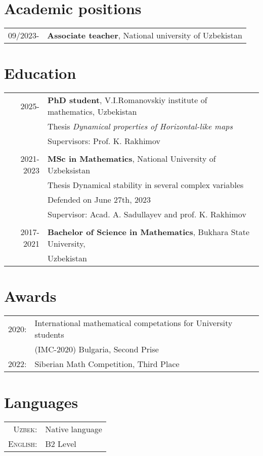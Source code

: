 \documentclass[a4paper,10pt]{article}
\begin{document}
\section{Academic positions}
\begin{tabular}{r|p{11cm}}
 \textsc{09/2023-}  &\textbf{Associate  teacher}, National university of Uzbekistan
\end{tabular}
\section{Education}
\begin{tabular}{r|p{11cm}}	
 \textsc{2025-} & \textbf{PhD student}, V.I.Romanovskiy institute of mathematics, Uzbekistan\\ 
 \textsc{ } & Thesis  \emph{Dynamical properties of Horizontal-like  maps} \\
\textsc{} &  Supervisors: Prof. K. Rakhimov\\ \\
\textsc{2021-2023} &\textbf{MSc in Mathematics}, National University of Uzbeksistan\\
 & 
Thesis Dynamical stability in several complex variables\\ &
Defended on June 27th, 2023\\ & Supervisor: Acad.  A. Sadullayev and prof. K. Rakhimov
\\ \\  \textsc{2017-2021}& \textbf{Bachelor of Science in Mathematics}, Bukhara State University,\\ & Uzbekistan
\end{tabular}



\section{Awards}
\begin{tabular}{rl}
 \textsc{2020:}  &  International mathematical competations for University students\\
 &(IMC-2020) Bulgaria, Second Prise\\

 \textsc{2022:}  & Siberian Math Competition, Third Place\\
    
\end{tabular}


\section{Languages}
\begin{tabular}{rl}
\textsc{Uzbek:}& Native language 
 \\ \textsc{English:}& B2 Level 
 
\end{tabular}
\end{document}

